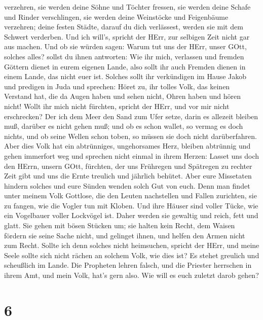 verzehren, sie werden deine Söhne und Töchter fressen, sie werden deine
Schafe und Rinder verschlingen, sie werden deine Weinstöcke und
Feigenbäume verzehren; deine festen Städte, darauf du dich verlässest,
werden sie mit dem Schwert verderben.  Und ich will's,
spricht der HErr, zur selbigen Zeit nicht gar aus machen. 
Und ob sie würden sagen: Warum tut uns der HErr, unser GOtt, solches
alles? sollst du ihnen antworten: Wie ihr mich, verlassen und fremden
Göttern dienet in eurem eigenen Lande, also sollt ihr auch Fremden
dienen in einem Lande, das nicht euer ist.  Solches sollt
ihr verkündigen im Hause Jakob und predigen in Juda und sprechen:
 Höret zu, ihr tolles Volk, das keinen Verstand hat, die da
Augen haben und sehen nicht, Ohren haben und hören nicht! 
Wollt ihr mich nicht fürchten, spricht der HErr, und vor mir nicht
erschrecken? Der ich dem Meer den Sand zum Ufer setze, darin es allezeit
bleiben muß, darüber es nicht gehen muß; und ob es schon wallet, so
vermag es doch nichts, und ob seine Wellen schon toben, so müssen sie
doch nicht darüberfahren.  Aber dies Volk hat ein
abtrünniges, ungehorsames Herz, bleiben abtrünnig und gehen immerfort
weg  und sprechen nicht einmal in ihrem Herzen: Lasset uns
doch den HErrn, unsern GOtt, fürchten, der uns Frühregen und Spätregen
zu rechter Zeit gibt und uns die Ernte treulich und jährlich behütet.
 Aber eure Missetaten hindern solches und eure Sünden
wenden solch Gut von euch.  Denn man findet unter meinem
Volk Gottlose, die den Leuten nachstellen und Fallen zurichten, sie zu
fangen, wie die Vogler tun mit Kloben.  Und ihre Häuser
sind voller Tücke, wie ein Vogelbauer voller Lockvögel ist. Daher werden
sie gewaltig und reich, fett und glatt.  Sie gehen mit
bösen Stücken um; sie halten kein Recht, dem Waisen fördern sie seine
Sache nicht, und gelinget ihnen, und helfen den Armen nicht zum Recht.
 Sollte ich denn solches nicht heimsuchen, spricht der
HErr, und meine Seele sollte sich nicht rächen an solchem Volk, wie dies
ist?  Es stehet greulich und scheußlich im Lande.
 Die Propheten lehren falsch, und die Priester herrschen in
ihrem Amt, und mein Volk, hat's gern also. Wie will es euch zuletzt
darob gehen?

\hypertarget{section-5}{%
\section{6}\label{section-5}}

